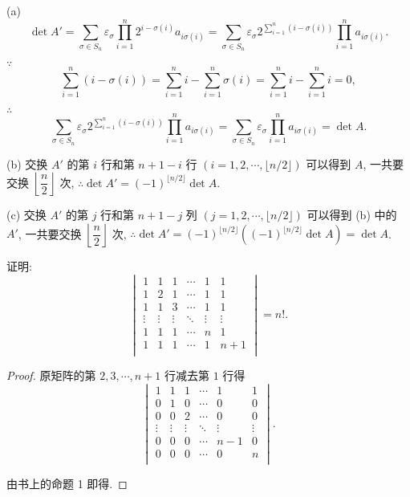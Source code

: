 \documentclass[color=black,device=normal,lang=cn,mode=geye]{elegantnote}
\begin{document}
\begin{solution}
    (a)
    \[\det A'=\sum\limits_{\sigma\in S_n}\varepsilon_\sigma\prod\limits_{i=1}^n2^{i-\sigma(i)}a_{i\sigma(i)}=\sum\limits_{\sigma\in S_n}\varepsilon_\sigma2^{\sum\limits_{i=1}^n (i-\sigma(i))}\prod\limits_{i=1}^na_{i\sigma(i)}.\]

    $\because$
    \[\sum\limits_{i=1}^n (i-\sigma(i))=\sum\limits_{i=1}^ni-\sum\limits_{i=1}^n\sigma(i)=\sum\limits_{i=1}^ni-\sum\limits_{i=1}^ni=0,\]

    $\therefore$
    \[\sum\limits_{\sigma\in S_n}\varepsilon_\sigma2^{\sum\limits_{i=1}^n(i-\sigma(i))}\prod\limits_{i=1}^na_{i\sigma(i)}=\sum\limits_{\sigma\in S_n}\varepsilon_\sigma\prod\limits_{i=1}^na_{i\sigma(i)}=\det A.\]

    (b) 交换 $A'$ 的第 $i$ 行和第 $n+1-i$ 行 $(i=1,2,\cdots,\lfloor n/2\rfloor)$ 可以得到 $A$, 一共要交换 $\left\lfloor\dfrac{n}{2}\right\rfloor$ 次, $\therefore\det A'=(-1)^{\lfloor n/2\rfloor}\det A$.

    (c) 交换 $A'$ 的第 $j$ 行和第 $n+1-j$ 列 $(j=1,2,\cdots,\lfloor n/2\rfloor)$ 可以得到 (b) 中的 $A'$, 一共要交换 $\left\lfloor\dfrac{n}{2}\right\rfloor$ 次, $\therefore\det A'=(-1)^{\lfloor n/2\rfloor}((-1)^{\lfloor n/2\rfloor}\det A)=\det A$.
\end{solution}
\begin{exercise}%
    证明:
    \[\begin{vmatrix}
    1 & 1 & 1 & \cdots & 1 & 1 \\
    1 & 2 & 1 & \cdots & 1 & 1 \\
    1 & 1 & 3 & \cdots & 1 & 1 \\
    \vdots & \vdots & \vdots & \ddots & \vdots & \vdots \\
    1 & 1 & 1 & \cdots  & n & 1 \\
    1 & 1 & 1 & \cdots  & 1 & n+1 \\
\end{vmatrix}=n!.\]
\end{exercise}
\begin{proof}
    原矩阵的第 $2,3,\cdots,n+1$ 行减去第 $1$ 行得
    \[\begin{vmatrix}
        1 & 1 & 1 & \cdots & 1 & 1 \\
        0 & 1 & 0 & \cdots & 0 & 0 \\
        0 & 0 & 2 & \cdots & 0 & 0 \\
        \vdots & \vdots & \vdots & \ddots & \vdots & \vdots \\
        0 & 0 & 0 & \cdots  & n-1 & 0 \\
        0 & 0 & 0 & \cdots  & 0 & n \\
    \end{vmatrix}.\]

    由书上的命题 1 即得.
\end{proof}
\end{document}
